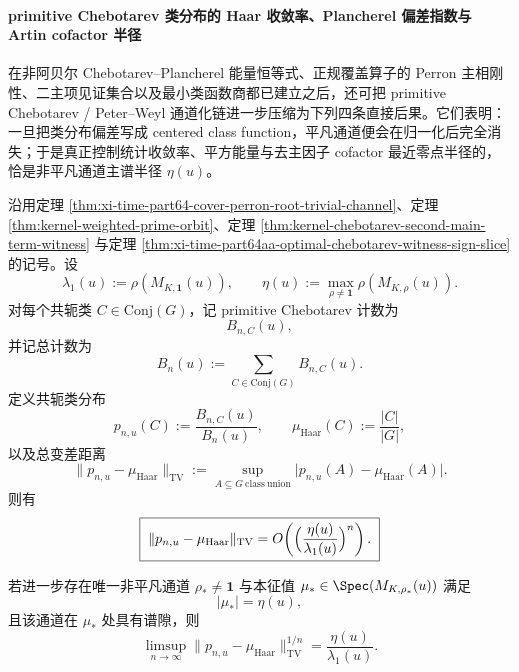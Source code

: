 \paragraph{primitive Chebotarev 类分布的 Haar 收敛率、Plancherel 偏差指数与 Artin cofactor 半径}
在非阿贝尔 Chebotarev--Plancherel 能量恒等式、正规覆盖算子的 Perron 主相刚性、二主项见证集合以及最小类函数商都已建立之后，还可把 primitive Chebotarev / Peter--Weyl 通道化链进一步压缩为下列四条直接后果。它们表明：一旦把类分布偏差写成 centered class function，平凡通道便会在归一化后完全消失；于是真正控制统计收敛率、平方能量与去主因子 cofactor 最近零点半径的，恰是非平凡通道主谱半径 \(\eta(u)\)。

\begin{theorem}\label{thm:xi-time-part64ab-primitive-chebotarev-haar-tv-exponent}
沿用定理 \ref{thm:xi-time-part64-cover-perron-root-trivial-channel}、定理
\ref{thm:kernel-weighted-prime-orbit}、定理
\ref{thm:kernel-chebotarev-second-main-term-witness} 与定理
\ref{thm:xi-time-part64aa-optimal-chebotarev-witness-sign-slice} 的记号。设
\[
\lambda_1(u):=\rho(M_{K,\mathbf 1}(u)),
\qquad
\eta(u):=\max_{\rho\neq \mathbf 1}\rho(M_{K,\rho}(u)).
\]
对每个共轭类 \(C\in \mathrm{Conj}(G)\)，记 primitive Chebotarev 计数为
\[
B_{n,C}(u),
\]
并记总计数为
\[
B_n(u):=\sum_{C\in \mathrm{Conj}(G)}B_{n,C}(u).
\]
定义共轭类分布
\[
p_{n,u}(C):=\frac{B_{n,C}(u)}{B_n(u)},
\qquad
\mu_{\mathrm{Haar}}(C):=\frac{|C|}{|G|},
\]
以及总变差距离
\[
\|p_{n,u}-\mu_{\mathrm{Haar}}\|_{\mathrm{TV}}
:=
\sup_{A\subseteq G\ \mathrm{class\ union}}
\bigl|p_{n,u}(A)-\mu_{\mathrm{Haar}}(A)\bigr|.
\]
则有
\[
\boxed{\;
\|p_{n,u}-\mu_{\mathrm{Haar}}\|_{\mathrm{TV}}
=
O\!\left(\Bigl(\frac{\eta(u)}{\lambda_1(u)}\Bigr)^n\right).\;}
\]

若进一步存在唯一非平凡通道 \(\rho_\ast\neq \mathbf 1\) 与本征值 \(\mu_\ast\in\Spec(M_{K,\rho_\ast}(u))\) 满足
\[
|\mu_\ast|=\eta(u),
\]
且该通道在 \(\mu_\ast\) 处具有谱隙，则
\[
\boxed{\;
\limsup_{n\to\infty}
\|p_{n,u}-\mu_{\mathrm{Haar}}\|_{\mathrm{TV}}^{1/n}
=
\frac{\eta(u)}{\lambda_1(u)}.\;}
\]
\end{theorem}
